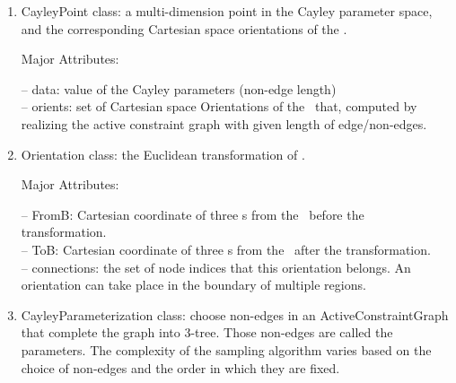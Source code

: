 \begin{enumerate}
\item \textsf{CayleyPoint} class: a multi-dimension point in the Cayley parameter space, and the corresponding Cartesian space orientations of the \helix.

\smallskip
Major Attributes:

\noindent --  \textsf{data}: value of the Cayley parameters (non-edge length)\\
\noindent --  \textsf{orients}: set of Cartesian space Orientations of the \helix\ that, computed by realizing the active constraint graph with given length of edge/non-edges.\\

\item \textsf{Orientation} class: the Euclidean transformation of \helix.

\smallskip
Major Attributes:

\noindent --  \textsf{FromB}: Cartesian coordinate of three \atom s from the \helix\ before the transformation.\\
\noindent --  \textsf{ToB}: Cartesian coordinate of three \atom s from the \helix\ after the transformation.\\
\noindent --  \textsf{connections}: the set of node indices that this orientation belongs. An orientation can take place in the boundary of multiple regions.\\

\item \textsf{CayleyParameterization} class: choose non-edges in an ActiveConstraintGraph that complete the graph into 3-tree. Those non-edges are called the parameters.
The complexity of the sampling algorithm varies based on the choice of non-edges and the order in which they are fixed.


\end{enumerate}
